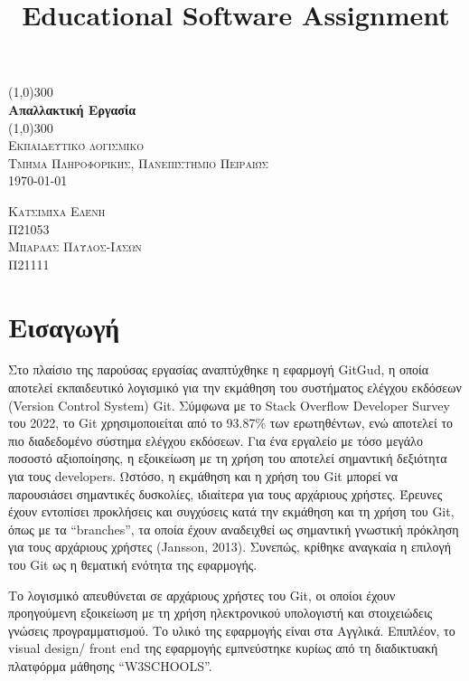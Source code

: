\documentclass{article}
\title{Educational Software Assignment}
\begin{document}
\begin{titlepage}
	\begin{center}
    \line(1,0){300}\\
    [0.65cm]
	\huge{\bfseries Απαλλακτική Εργασία}\\
	\line(1,0){300}\\
	\textsc{\Large Εκπαιδευτικό λογισμικο}\\
    \textsc{\Large Τμήμα Πληροφορικής, Πανεπιστήμιο Πειραιώς}\\
	\textsc{\LARGE \today}\\
	[5.5cm]
	\end{center}
	\begin{flushright}
		\textsc{\Large Κατσιμίχα Ελένη\\Π21053}\\
		[0.5cm]
		\textsc{\Large Μπαρλάς Παύλος-Ιάσων\\Π21111}\\
		[0.5cm]
	\end{flushright}
\end{titlepage}

\tableofcontents
\newpage


\section{Εισαγωγή}
Στο πλαίσιο της παρούσας εργασίας αναπτύχθηκε η εφαρμογή \foreignlanguage{english}{GitGud}, η οποία αποτελεί εκπαιδευτικό λογισμικό για την εκμάθηση του συστήματος ελέγχου εκδόσεων \foreignlanguage{english}{(Version Control System) Git}. Σύμφωνα με το \foreignlanguage{english}{Stack Overflow Developer Survey} του 2022, το \foreignlanguage{english}{Git} χρησιμοποιείται από το 93.87\%
των ερωτηθέντων, ενώ αποτελεί το πιο διαδεδομένο σύστημα ελέγχου εκδόσεων. Για ένα εργαλείο με τόσο μεγάλο ποσοστό αξιοποίησης, η εξοικείωση με τη χρήση του αποτελεί σημαντική δεξιότητα για τους \foreignlanguage{english}{developers}. Ωστόσο, η εκμάθηση και η χρήση του \foreignlanguage{english}{Git} μπορεί να παρουσιάσει σημαντικές δυσκολίες, ιδιαίτερα για τους αρχάριους χρήστες. Έρευνες έχουν εντοπίσει προκλήσεις και συγχύσεις κατά την εκμάθηση και τη χρήση του \foreignlanguage{english}{Git}, όπως με τα “\foreignlanguage{english}{branches}”, τα οποία έχουν αναδειχθεί ως σημαντική γνωστική πρόκληση για τους αρχάριους χρήστες \foreignlanguage{english}{(Jansson, 2013)}. Συνεπώς, κρίθηκε αναγκαία η επιλογή του \foreignlanguage{english}{Git} ως η θεματική ενότητα της εφαρμογής.

Το λογισμικό απευθύνεται σε αρχάριους χρήστες του \foreignlanguage{english}{Git}, οι οποίοι έχουν προηγούμενη εξοικείωση με τη χρήση ηλεκτρονικού υπολογιστή και στοιχειώδεις γνώσεις προγραμματισμού. Το υλικό της εφαρμογής είναι στα Αγγλικά. Επιπλέον, το \foreignlanguage{english}{visual design/ front end} της εφαρμογής εμπνεύστηκε κυρίως από τη διαδικτυακή πλατφόρμα μάθησης “\foreignlanguage{english}{W3SCHOOLS}”.
\end{document}
